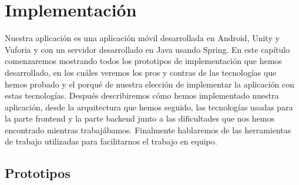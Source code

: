 
\cleardoublepage


\chapter{Implementación}
\label{makereference4}
Nuestra aplicación es una aplicación móvil desarrollada en Android, Unity y Vuforia y con un servidor desarrollado en Java usando Spring.
En este capítulo comenzaremos mostrando todos los prototipos de implementación que hemos desarrollado, en los cuáles veremos los pros y contras de las
tecnologías que hemos probado y el porqué de nuestra elección de implementar la aplicación con estas tecnologías. 
Después describiremos cómo hemos implementado nuestra aplicación, desde la arquitectura que hemos seguido, 
las tecnologías usadas para la parte frontend y la parte backend junto a las dificultades 
que nos hemos encontrado mientras trabajábamos. Finalmente hablaremos de las herramientas de trabajo
utilizadas para facilitarnos el trabajo en equipo.
\section{Prototipos}
\label{makereference4.1}

